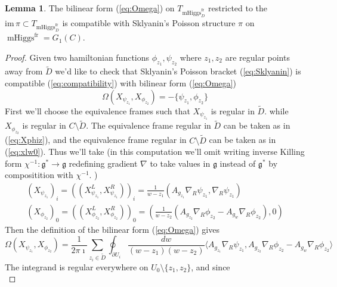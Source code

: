 \documentclass[11pt, oneside, reqno]{amsart}
\theoremstyle{definition} \newtheorem{definition}{Definition}[section]
\newtheorem{lemma}[definition]{Lemma}
\theoremstyle{definition} \newtheorem{remark}[definition]{Remark}
\theoremstyle{definition} \newtheorem{remarks}[definition]{Remarks}
\theoremstyle{definition} \newtheorem{question}[definition]{Question}
\theoremstyle{definition} \newtheorem*{note}{Note}
\theoremstyle{definition} \newtheorem{example}[definition]{Example}
\theoremstyle{definition} \newtheorem{examples}[definition]{Examples}
\renewcommand{\gg}{\mathfrak{g}}
\DeclareMathOperator{\mhiggs}{mHiggs}
\newcommand{\fr}{\mathrm{fr}}
\begin{document}
\begin{lemma}\label{lemma:OmegaPi}
  The bilinear form (\ref{eq:Omega}) on $T_{\mhiggs^{\fr}_{D}}$ 
restricted to the $\mathrm{im} \, \pi \subset T_{\mhiggs^{\fr}_{D}}$  is compatible
  with Sklyanin's Poisson structure $\pi$ on $\mhiggs^{\fr} = G_1(C)$.
\end{lemma}
\begin{proof}
  Given two hamiltonian functions $\phi_{z_1}, \psi_{z_2}$ where $z_1, z_2$ are regular
  points away from $\tilde D$ we'd like to check
  that Sklyanin's Poisson bracket (\ref{eq:Sklyanin})  
is compatible (\ref{eq:compatibility}) with bilinear form  (\ref{eq:Omega})
\begin{equation}
  \Omega(X_{\psi_{z_1}}, X_{\phi_{z_2}})  = - \{\psi_{z_1}, \phi_{z_2}\}
\end{equation}
First we'll choose the equivalence frames such that $X_{\psi_{z_1}}$ is regular in $\tilde D$. 
while $X_{\phi_{z_2}}$ is regular in $C \setminus \tilde D$.
The equivalence frame regular in $\tilde D$ can be taken as in  (\ref{eq:Xphiz}),
and the equivalence frame regular in $C \setminus \tilde D$ can be taken
as in (\ref{eq:xlw0}). Thus we'll take (in this computation we'll omit writing inverse
Killing form $\chi^{-1}: \gg^{*} \to \gg $ redefining gradient $\nabla$ to take values in $\gg$ instead of $\gg^{*}$
by compositition with $\chi^{-1}$. )
\begin{equation}
  \begin{aligned}
    (X_{\psi_{z_1}})_{i} = ((X_{\psi_{z_1}}^{L}, X_{\psi_{z_1}}^{R}))_{i} =  \frac{1}{w - z_1} (A_{g_{z_1}} \nabla_R \psi_{z_1},   \nabla_{R} \psi_{z_1}) \\
    (X_{\phi_{z_2}})_{0} = ((X_{\phi_{z_2}}^{L}, X_{\phi_{z_2}}^{R}))_{0} = ( \frac{1}{w - z_2} ( A_{g_{z_2}} \nabla_R \phi_{z_2} - A_{g_{w}} \nabla_{R} \phi_{z_2}), 0) 
  \end{aligned}
\end{equation}
Then the definition of the bilinear form (\ref{eq:Omega}) gives
\begin{equation}
  \label{eq:pairing}
  \Omega(X_{\psi_{z_1}}, X_{\phi_{z_2}}) = \frac{1}{2 \pi \imath }
  \sum_{z_i \in \tilde D} \oint_{\partial U_i} \frac{dw }{(w - z_1)(w - z_2)} \langle A_{g_{z_1}} \nabla_{R} \psi_{z_1},
  A_{g_{z_2}} \nabla_{R} \phi_{z_2}  - A_{g_w} \nabla_{R} \phi_{z_2} \rangle
\end{equation}
The integrand is regular everywhere on $U_0 \setminus \{z_1, z_2\}$, and since
\begin{equation}
\label{eq:residue}

\end{equation}
\end{proof}
\end{document}
